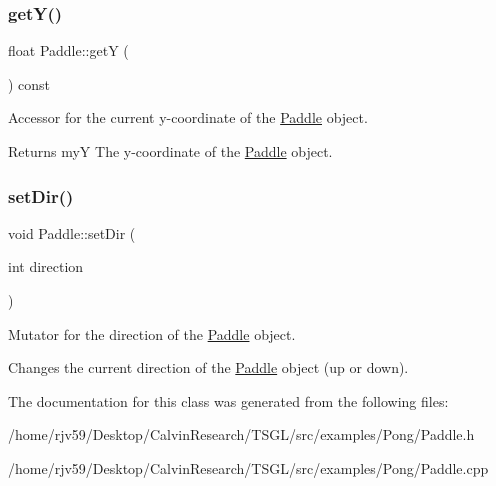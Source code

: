 \subsubsection{\texorpdfstring{get\+Y()}{getY()}}
{\footnotesize\ttfamily float Paddle\+::getY (\begin{DoxyParamCaption}{ }\end{DoxyParamCaption}) const}



Accessor for the current y-\/coordinate of the \hyperlink{class_paddle}{Paddle} object. 

\begin{DoxyReturn}{Returns}
myY The y-\/coordinate of the \hyperlink{class_paddle}{Paddle} object. 
\end{DoxyReturn}
\mbox{\label{class_paddle_a5f23f811b810d1f4a84b25357bc86e94}} 
\subsubsection{\texorpdfstring{set\+Dir()}{setDir()}}
{\footnotesize\ttfamily void Paddle\+::set\+Dir (\begin{DoxyParamCaption}\item[{int}]{direction }\end{DoxyParamCaption})}



Mutator for the direction of the \hyperlink{class_paddle}{Paddle} object. 

Changes the current direction of the \hyperlink{class_paddle}{Paddle} object (up or down). 

The documentation for this class was generated from the following files\+:\begin{DoxyCompactItemize}
\item 
/home/rjv59/\+Desktop/\+Calvin\+Research/\+T\+S\+G\+L/src/examples/\+Pong/Paddle.\+h\item 
/home/rjv59/\+Desktop/\+Calvin\+Research/\+T\+S\+G\+L/src/examples/\+Pong/Paddle.\+cpp\end{DoxyCompactItemize}
